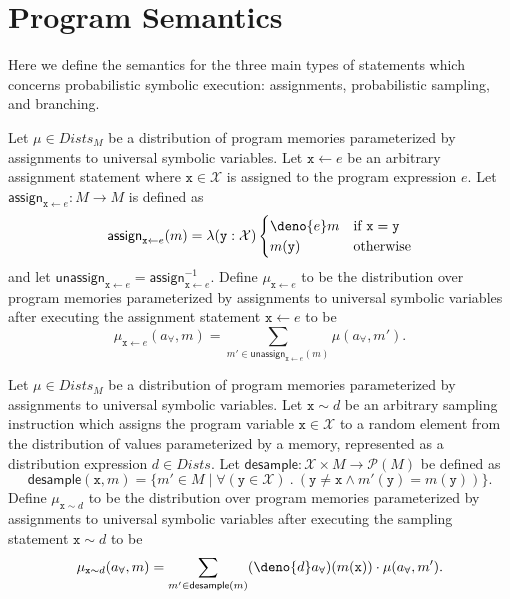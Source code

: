 \documentclass[acmsmall,review,anonymous]{acmart}\settopmatter{printfolios=true,printccs=false,printacmref=false}
\begin{document}



\appendix
\allowdisplaybreaks

\section{Program Semantics}
\label{sec:semantics}
Here we define the semantics for the three main types of statements which concerns probabilistic symbolic execution: assignments, probabilistic sampling, and branching.

\begin{definition}
  \label{def:assignment}
  Let $\mu \in \mathit{Dists_M}$ be a distribution of program memories parameterized by assignments to universal symbolic variables. Let $\mathtt{x} \gets e$ be an arbitrary assignment statement where $\mathtt{x} \in \mathcal{X}$ is assigned to the program expression $e$. Let $\mathsf{assign}_{\mathtt{x}\gets e} : \mathit{M} \rightarrow \mathit{M}$ is defined as
  \[
    \mathsf{assign}_{\mathtt{x}\gets e}(m) = \lambda(\mathtt{y} : \mathcal{X})
    \begin{cases}
      \deno{e}m     & \text{if $\mathtt{x} = \mathtt{y}$} \\
      m(\mathtt{y}) & \text{otherwise}
    \end{cases}
  \]
  and let $\mathsf{unassign}_{\mathtt{x}\gets e} = \mathsf{assign}_{\mathtt{x}\gets e}^{-1}$. Define $\mu_{\mathtt{x}\gets e}$ to be the distribution over program memories parameterized by assignments to universal symbolic variables after executing the assignment statement $\mathtt{x}\gets e$ to be
  \[
    \mu_{\mathtt{x}\gets e}(a_{\forall},m) = \sum_{m' \in \mathsf{unassign}_{\mathtt{x}\gets e}(m)} \mu(a_{\forall},m').
  \]
\end{definition}

\begin{definition}
  \label{def:sampling}
  Let $\mu \in \mathit{Dists_M}$ be a distribution of program memories parameterized by assignments to universal symbolic variables. Let $\mathtt{x} \sim d$ be an arbitrary sampling instruction which assigns the program variable $\mathtt{x} \in \mathcal{X}$ to a random element from the distribution of values parameterized by a memory, represented as a distribution expression $d \in \mathit{Dists}$. Let $\mathsf{desample} : \mathcal{X} \times \mathit{M} \rightarrow \mathcal{P}(\mathit{M})$ be defined as
  \[
    \mathsf{desample}(\mathtt{x},m) = \{ m'\in \mathit{M} \mid \forall (\mathtt{y} \in \mathcal{X})~.~(\mathtt{y} \neq \mathtt{x} \wedge m'(\mathtt{y}) = m(\mathtt{y}))\}.
  \]
  Define $\mu_{\mathtt{x} \sim d}$ to be the distribution over program memories parameterized by assignments to universal symbolic variables after executing the sampling statement $\mathtt{x} \sim d$ to be
  \[
    \mu_{\mathtt{x} \sim d}(a_{\forall},m) = \sum_{m' \in \mathsf{desample}(m)} (\deno{d}a_{\forall})(m(\mathtt{x})) \cdot \mu(a_{\forall},m').
  \]
\end{definition}
\end{document}
